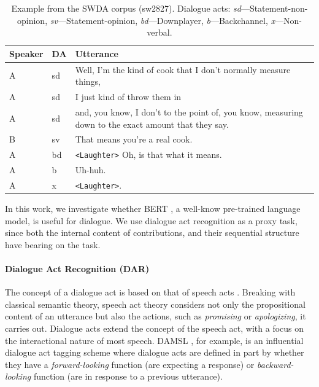 \documentclass[11pt,a4paper]{article}
\begin{document}
\begin{table}
  \centering
  \begin{tabularx}{\linewidth}{llL}
    \toprule
    Speaker & DA & Utterance \\ \midrule
    A	&sd	& Well, I'm the kind of cook that I don't normally measure things,  \\
    A	&sd	& I just kind of throw them in \\
    A	&sd	& and, you know, I don't to the point of, you know, measuring down to the exact amount that they say.  \\
    B	&sv	& That means you're a real cook. \\
    A	&bd	& \texttt{<Laughter>} Oh, is that what it means.  \\
    A	&b	& Uh-huh.  \\
    A	&x	& \texttt{<Laughter>}.\\
             \bottomrule
  \end{tabularx}
  \caption{Example from the SWDA corpus (sw2827). Dialogue acts: \emph{sd}---Statement-non-opinion, \emph{sv}---Statement-opinion, \emph{bd}---Downplayer, \emph{b}---Backchannel, \emph{x}---Non-verbal. }
  \label{table:example}
\end{table}

In this work, we investigate whether BERT \citep{devlinBERTPretrainingDeep2018}, a well-know pre-trained language model, is useful for dialogue.
We use dialogue act recognition  as a proxy task, since both the internal content of contributions, and their sequential structure have bearing on the task.

\paragraph{Dialogue Act Recognition (DAR)}
The concept of a dialogue act is based on that of speech acts \citep{austinHowThingsWords2009}.
Breaking with classical semantic theory, speech act theory considers not only the propositional content of an utterance but also the actions, such as \emph{promising} or \emph{apologizing}, it carries out.
Dialogue acts extend the concept of the speech act, with a focus on the interactional nature of most speech.
DAMSL \citep{coreCodingDialogsDAMSL1997}, for example, is an influential dialogue act tagging scheme where dialogue acts are defined in part by whether they have a \emph{forward-looking} function (are expecting a response) or \emph{backward-looking} function (are in response to a previous utterance).
\end{document}
